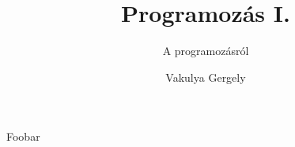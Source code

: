 \documentclass[
	11pt, %
]{beamer}
\title{Programozás I.}
\subtitle{A programozásról}
\author{Vakulya Gergely}
\institute[UC]{Óbudai Egyetem, AMK \\ \smallskip \textit{vakulya.gergely@amk.uni-obuda.hu}}
\date{}
\begin{document}
\begin{frame}

  \titlepage

\end{frame}

\begin{frame}
  Foobar

\end{frame}
\end{document}
